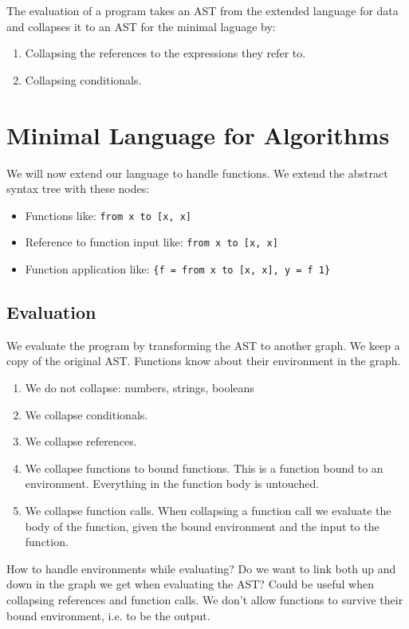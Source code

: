 \documentclass[a4paper,12pt]{article}
\begin{document}
The evaluation of a program takes an AST from the extended language for data and collapses it to an AST for the minimal laguage by:
\begin{enumerate}
\item Collapsing the references to the expressions they refer to.
\item Collapsing conditionals.
\end{enumerate}

\section{Minimal Language for Algorithms}

We will now extend our language to handle functions. We extend the abstract syntax tree with these nodes:
\begin{itemize}
\item Functions like: \lstinline|from x to [x, x]|
\item Reference to function input like: \lstinline|from x to [x, x]|
\item Function application like: \lstinline|{f = from x to [x, x], y = f 1}|
\end{itemize}

\subsection{Evaluation}

We evaluate the program by transforming the AST to another graph. We keep a copy of the original AST. Functions know about their environment in the graph.
\begin{enumerate}
\item We do not collapse: numbers, strings, booleans
\item We collapse conditionals.
\item We collapse references.
\item We collapse functions to bound functions. This is a function bound to an environment. Everything in the function body is untouched.
\item We collapse function calls. When collapsing a function call we evaluate the body of the function, given the bound environment and the input to the function.
\end{enumerate}
How to handle environments while evaluating? Do we want to link both up and down in the graph we get when evaluating the AST? Could be useful when collapsing references and function calls. We don't allow functions to survive their bound environment, i.e. to be the output.
\end{document}

